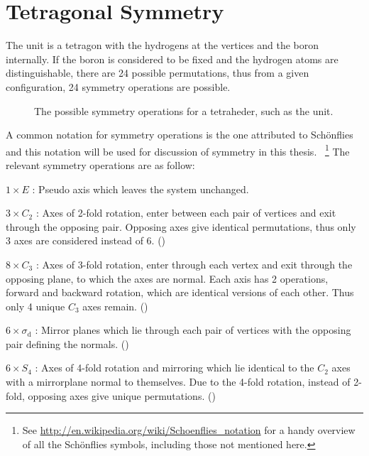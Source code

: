 \section{Tetragonal Symmetry}
\label{sec:symmetry}

The  unit is a tetragon with the hydrogens at the vertices and the boron internally.
If the boron is considered to be fixed and the hydrogen atoms are distinguishable, there are 24 possible permutations, thus from a given configuration, 24 symmetry operations are possible.

\begin{figure}[h!]
  \begin{center}
\newline
    \parbox{0.85\linewidth}{
      \caption{The possible symmetry operations for a tetraheder, such as the  unit.
      }
      \label{fig:symmetry}
    }
  \end{center}
\end{figure}

A common notation for symmetry operations is the one attributed to Sch\"onflies~\cite{schonflies-notation-1889} and this notation will be used for discussion of symmetry in this thesis.
~\footnote{See \url{http://en.wikipedia.org/wiki/Schoenflies_notation} for a handy overview of all the Sch\"onflies symbols, including those not mentioned here.}
The relevant symmetry operations are as follow:
\bit
\item $1 \times E$ : Pseudo axis which leaves the system unchanged.
\item $3 \times C_2$ : Axes of 2-fold rotation, enter between each pair of vertices and exit through the opposing pair.
Opposing axes give identical permutations, thus only 3 axes are considered instead of 6.
()
\item $8 \times C_3$ : Axes of 3-fold rotation, enter through each vertex and exit through the opposing plane, to which the axes are normal. Each axis has 2 operations, forward and backward rotation, which are identical versions of each other.
Thus only 4 unique $C_3$ axes remain.
()
\item $6 \times \sigma_\text{d}$ : Mirror planes which lie through each pair of vertices with the opposing pair defining the normals.
()
\item $6 \times S_4$ : Axes of 4-fold rotation and mirroring which lie identical to the $C_2$ axes with a mirrorplane normal to themselves. Due to the 4-fold rotation, instead of 2-fold, opposing axes give unique permutations.
()
\eit

